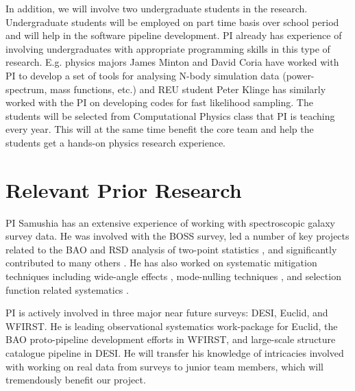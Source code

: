 In addition, we will involve two undergraduate students in the research.
Undergraduate students will be employed on part time basis over school period
and will help in the software pipeline development. PI already has experience
of involving undergraduates with appropriate programming skills in this type of
research. E.g. physics majors James Minton and David Coria have worked with PI
to develop a set of tools for analysing N-body simulation data (power-spectrum,
mass functions, etc.) and REU student Peter Klinge has similarly worked with
the PI on developing codes for fast likelihood sampling. The students will be
selected from Computational Physics class that PI is teaching every year. This
will at the same time benefit the core team and help the students get a
hands-on physics research experience.







\section{Relevant Prior Research}

PI Samushia has an extensive experience of working with spectroscopic galaxy
survey data. He was involved with the BOSS survey, led a number of key projects
related to the BAO and RSD analysis of two-point statistics
\cite{2013MNRAS.429.1514S,2014MNRAS.439.3504S}, and significantly contributed
to many others
\cite{2012MNRAS.426.2719R,2015MNRAS.447..437M,2015MNRAS.449..835R,2015MNRAS.449..848H}.
He has also worked on systematic mitigation techniques including wide-angle
effects \cite{2010MNRAS.409.1525R,2012MNRAS.420.2102S,2015MNRAS.452.3704S},
mode-nulling techniques \cite{2016MNRAS.463..467K,2019MNRAS.482..453K}, and
selection function related systematics \cite{2014MNRAS.437.1109R}.

PI is actively involved in three major near future surveys: DESI, Euclid, and
WFIRST. He is leading observational systematics work-package for Euclid, the
BAO proto-pipeline development efforts in WFIRST, and large-scale structure
catalogue pipeline in DESI. He will transfer his knowledge of intricacies
involved with working on real data from surveys to junior team members, which
will tremendously benefit our project.

